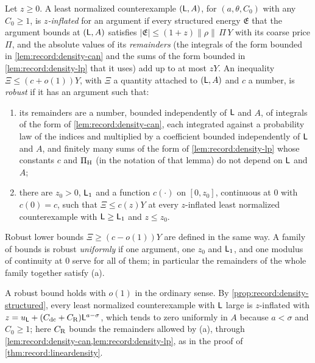 \begin{definition}\label{def:robust}
Let $z\ge0$. A least normalized counterexample $(\mathsf L,A)$, for
$(a,\theta,C_0)$ with any $C_0\ge1$, is
\emph{$z$-inflated} for an argument if every structured energy $\mathfrak E$
that the argument bounds at $(\mathsf L,A)$ satisfies $|\mathfrak
E|\le(1+z)\|\rho\|\,\Pi\,Y$ with its coarse price $\Pi$, and the absolute
values of its \emph{remainders} (the integrals of the form bounded in
\cref{lem:record:density-can} and the sums of the form bounded in
\cref{lem:record:density-lp} that it uses) add up to at most $zY$. An
inequality $\Xi\le(c+o(1))Y$, with $\Xi$ a quantity attached to $(\mathsf L,A)$ and
$c$ a number, is \emph{robust} if it has an argument such that:
\begin{enumerate}[label=(\alph*)]
\item its remainders are a number, bounded independently of $\mathsf L$ and $A$,
 of integrals of the form of \cref{lem:record:density-can}, each integrated
 against a probability law of the indices and multiplied by a coefficient
 bounded independently of $\mathsf L$ and $A$, and finitely many sums of the form
 of \cref{lem:record:density-lp} whose constants $c$ and $\Pi_{\rm H}$ (in the
 notation of that lemma) do not depend on $\mathsf L$ and $A$;
\item there are $z_0>0$, $\mathsf L_1$ and a function $c(\cdot)$ on $[0,z_0]$,
 continuous at $0$ with $c(0)=c$, such that $\Xi\le c(z)Y$ at every
 $z$-inflated least normalized counterexample with $\mathsf L\ge\mathsf L_1$ and $z\le
 z_0$.
\end{enumerate}
Robust lower bounds $\Xi\ge(c-o(1))Y$ are defined in the same way. A family of
bounds is robust \emph{uniformly} if one argument, one $z_0$ and $\mathsf L_1$, and
one modulus of continuity at $0$ serve for all of them; in particular the
remainders of the whole family together satisfy (a).
\end{definition}

A robust bound holds with $o(1)$ in the ordinary sense. By
\cref{prop:record:density-structured}, every least normalized counterexample
with $\mathsf L$ large is $z$-inflated with
$z=u_\mathsf L+(C_{\rm dc}+C_{\rm R})\mathsf L^{a-\sigma}$, which tends to zero uniformly
in $A$ because $a<\sigma$ and $C_0\ge1$; here $C_{\rm R}$ bounds the
remainders allowed by (a), through
\cref{lem:record:density-can,lem:record:density-lp}, as in the proof of
\cref{thm:record:lineardensity}.


